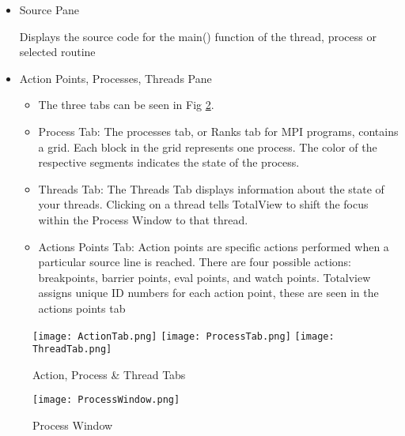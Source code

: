 \documentclass{article}
\begin{document}
\begin{itemize}
\begin{itemize}
		Displays information on the current thread's variables, ie allows users to see the current/stored values in existing variables. The frame is seen in Fig \ref{fig:diving}.
		\begin{figure}[p] %
		\begin{center}
			\texttt{[image: SourceFrame.png]}
		\caption{Diving in Function}
		\label{fig:diving}
		\end{center}
	\end{figure}
		\item Source Pane
		
		Displays the source code for the main() function of the thread, process or selected routine
		\item Action Points, Processes, Threads Pane
		\begin{itemize}
		\item The three tabs can be seen in Fig \ref{fig:action_proc_thread_tabs}.
		\item Process Tab: The processes tab, or Ranks tab for MPI programs, contains a grid. Each block in the grid represents one process. The color of the respective segments indicates the state of the process. 
		\item Threads Tab: The Threads Tab displays information about the state of your threads. Clicking on a thread tells TotalView to shift the focus within the Process Window to that thread.
		\item Actions Points Tab: Action points are specific actions performed when a particular source line is reached. There are four possible actions: breakpoints, barrier points, eval points, and watch points. Totalview assigns unique ID numbers for each action point, these are seen in the actions points tab
		\end{itemize}
	\end{itemize}
	\begin{figure}[p] %
		\begin{center}	
		\texttt{[image: ActionTab.png]}
		\texttt{[image: ProcessTab.png]}
		\texttt{[image: ThreadTab.png]}
		\caption{Action, Process \& Thread Tabs}
		\label{fig:action_proc_thread_tabs}
			\end{center}
	\end{figure}


	\begin{figure}[p] %
		\begin{center}
			\texttt{[image: ProcessWindow.png]}
		\caption{Process Window}
		\label{fig:proc_window}
		\end{center}
	\end{figure}


\end{itemize}
\end{document}
